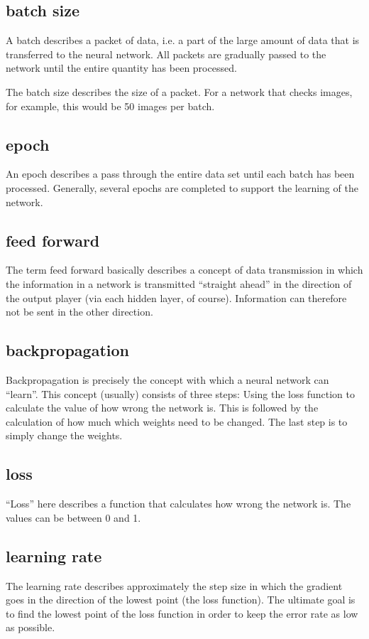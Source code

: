 \documentclass[a4paper]{article}
\begin{document}
\subsection*{batch size}
A batch describes a packet of data, i.e. a part of the large amount of data that is transferred to the neural network. All packets are gradually passed to the network until the entire quantity has been processed.


The batch size describes the size of a packet. For a network that checks images, for example, this would be 50 images per batch.

\subsection*{epoch}
An epoch describes a pass through the entire data set until each batch has been processed.
Generally, several epochs are completed to support the learning of the network.

\subsection*{feed forward}
The term feed forward basically describes a concept of data transmission in which the information in a network is transmitted “straight ahead” in the direction of the output player (via each hidden layer, of course). Information can therefore not be sent in the other direction.

\subsection*{backpropagation}
Backpropagation is precisely the concept with which a neural network can “learn”.
This concept (usually) consists of three steps:
Using the loss function to calculate the value of how wrong the network is. This is followed by the calculation of how much which weights need to be changed.
The last step is to simply change the weights.

\subsection*{loss}
“Loss” here describes a function that calculates how wrong the network is. The values can be between 0 and 1.

\subsection*{learning rate}
The learning rate describes approximately the step size in which the gradient goes in the direction of the lowest point (the loss function).
The ultimate goal is to find the lowest point of the loss function in order to keep the error rate as low as possible.
\end{document}
